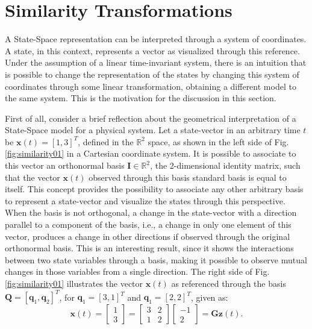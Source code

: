 \documentclass[a4paper,11pt]{book}
\numberwithin{figure}{chapter}
\numberwithin{equation}{chapter}
\numberwithin{table}{chapter}
\theoremstyle{definition}
\begin{document}
\section{Similarity Transformations}

A State-Space representation can be interpreted through a system of coordinates. A state, in this context, represents a vector as visualized through this reference. Under the assumption of a linear time-invariant system, there is an intuition that is possible to change the representation of the states by changing this system of coordinates through some linear transformation, obtaining a different model to the same system. This is the motivation for the discussion in this section.

First of all, consider a brief reflection about the geometrical interpretation of a State-Space model for a physical system. Let a state-vector in an arbitrary time $t$ be $\bm{x}(t) = [1, 3]^T$, defined in the $\mathbb{R}^{2}$ space, as shown in the left side of Fig. \ref{fig:similarity01} in a Cartesian coordinate system. It is possible to associate to this vector an orthonormal basis $\bm{I} \in \mathbb{R}^2$, the 2-dimensional identity matrix, such that the vector $\bm{x}(t)$ observed through this basis standard basis is equal to itself. This concept provides the possibility to associate any other arbitrary basis to represent a state-vector and visualize the states through this perspective. When the basis is not orthogonal, a change in the state-vector with a direction parallel to a component of the basis, i.e., a change in only one element of this vector, produces a change in other directions if observed through the original orthonormal basis. This is an interesting result, since it shows the interactions between two state variables through a basis, making it possible to observe mutual changes in those variables from a single direction. The right side of Fig. \ref{fig:similarity01} illustrates the vector $\bm{x}(t)$ as referenced through the basis $\bm{Q} = [\bm{q}_1, \bm{q}_2]^T$, for $\bm{q}_1 = [3, 1]^T$ and $\bm{q}_1 = [2, 2]^T$, given as: 
\begin{equation}
    \bm{x}(t) = \begin{bmatrix} 1 \\ 3 \end{bmatrix} = \begin{bmatrix} 3 & 2 \\ 1 & 2 \end{bmatrix} \begin{bmatrix} -1 \\ 2 \end{bmatrix} = \bm{G}\bm{z}(t)
.\end{equation}
\end{document}
